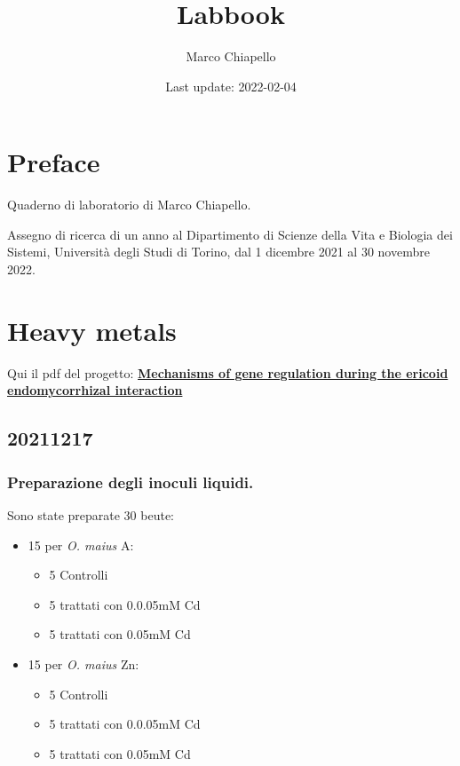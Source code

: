 \documentclass[
]{book}
\title{Labbook}
\author{Marco Chiapello}
\date{Last update: 2022-02-04}
\providecommand{\tightlist}{%
  \setlength{\itemsep}{0pt}\setlength{\parskip}{0pt}}
\begin{document}
\maketitle

{
\setcounter{tocdepth}{1}
\tableofcontents
}
\hypertarget{preface}{%
\chapter{Preface}\label{preface}}

Quaderno di laboratorio di Marco Chiapello.

Assegno di ricerca di un anno al Dipartimento di Scienze della Vita e Biologia dei Sistemi, Università degli Studi di Torino, dal 1 dicembre 2021 al 30 novembre 2022.

\hypertarget{hm}{%
\chapter{Heavy metals}\label{hm}}

Qui il pdf del progetto: \href{Documents/CHIAPELLO_proposal.pdf}{\textbf{Mechanisms of gene regulation during the ericoid endomycorrhizal interaction}}

\hypertarget{D20211217}{%
\section{20211217}\label{D20211217}}

\hypertarget{preparazione-degli-inoculi-liquidi.}{%
\subsection{Preparazione degli inoculi liquidi.}\label{preparazione-degli-inoculi-liquidi.}}

Sono state preparate 30 beute:

\begin{itemize}
\tightlist
\item
  15 per \emph{O. maius} A:

  \begin{itemize}
  \tightlist
  \item
    5 Controlli
  \item
    5 trattati con 0.0.05mM Cd
  \item
    5 trattati con 0.05mM Cd
  \end{itemize}
\item
  15 per \emph{O. maius} Zn:

  \begin{itemize}
  \tightlist
  \item
    5 Controlli
  \item
    5 trattati con 0.0.05mM Cd
  \item
    5 trattati con 0.05mM Cd
  \end{itemize}
\end{itemize}
\end{document}
